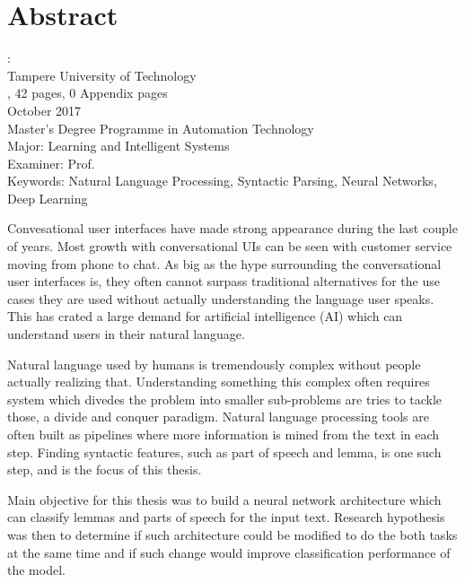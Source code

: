 \documentclass[12pt,a4paper,english
]{tutthesis}
\begin{document}
\chapter*{Abstract}

\begin{spacing}{1.0}
         {\bf \textsf{\MakeUppercase{\@author}}}: \@title\\   %
         \textsf{Tampere University of Technology}\\
         \textsf{\@thesistype, 42 pages, 0 Appendix pages} \\
         \textsf{October 2017}\\
         \textsf{Master's Degree Programme in Automation Technology}\\
         \textsf{Major: Learning and Intelligent Systems}\\
         \textsf{Examiner: Prof. \@examiner}\\ %
         \textsf{Keywords: Natural Language Processing, Syntactic Parsing, Neural Networks, Deep Learning}\\
\end{spacing}

Convesational user interfaces have made strong appearance during the last couple of years. Most growth with conversational UIs can be seen with customer service moving from phone to chat. As big as the hype surrounding the conversational user interfaces is, they often cannot surpass traditional alternatives for the use cases they are used without actually understanding the language user speaks. This has crated a large demand for artificial intelligence (AI) which can understand users in their natural language.

Natural language used by humans is tremendously complex without people actually realizing that. Understanding something this complex often requires system which divedes the problem into smaller sub-problems are tries to tackle those, a divide and conquer paradigm. Natural language processing tools are often built as pipelines where more information is mined from the text in each step. Finding syntactic features, such as part of speech and lemma,  is one such step, and is the focus of this thesis.

Main objective for this thesis was to build a neural network architecture which can classify lemmas and parts of speech for the input text. Research hypothesis was then to determine if such architecture could be modified to do the both tasks at the same time and if such change would improve classification performance of the model.
\end{document}
